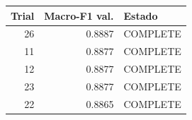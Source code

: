 \begin{tabular}{rrl}
\toprule
\textbf{Trial} & \textbf{Macro-F1 val.} & \textbf{Estado} \\
\midrule
26 & 0.8887 & COMPLETE \\
11 & 0.8877 & COMPLETE \\
12 & 0.8877 & COMPLETE \\
23 & 0.8877 & COMPLETE \\
22 & 0.8865 & COMPLETE \\
\bottomrule
\end{tabular}
